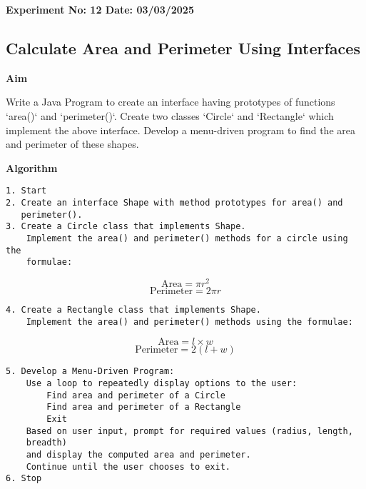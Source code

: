 \textbf{Experiment No: 12 \hfill Date: 03/03/2025}

\begin{center}
    \Large \subsection*{Calculate Area and Perimeter Using Interfaces}
\end{center}

\textbf{Aim}
\vspace{0.5cm}

Write a Java Program to create an interface having prototypes of functions ‘area()‘ and ‘perimeter()‘. Create two classes ‘Circle‘ and ‘Rectangle‘ which implement the above interface. Develop a menu-driven program to find the area and perimeter of these shapes.

\vspace{0.5cm}
\textbf{Algorithm}
\vspace{0.5cm}
\begin{verbatim}
1. Start
2. Create an interface Shape with method prototypes for area() and 
   perimeter().
3. Create a Circle class that implements Shape.
    Implement the area() and perimeter() methods for a circle using the 
    formulae:
\end{verbatim}
\[
\text{Area} = \pi r^2
\]
\[
\text{Perimeter} = 2\pi r
\]
\begin{verbatim}
4. Create a Rectangle class that implements Shape.
    Implement the area() and perimeter() methods using the formulae:
\end{verbatim}
\[
\text{Area} = l \times w
\]
\[
\text{Perimeter} = 2(l + w)
\]
\begin{verbatim}
5. Develop a Menu-Driven Program:
    Use a loop to repeatedly display options to the user:
        Find area and perimeter of a Circle
        Find area and perimeter of a Rectangle
        Exit
    Based on user input, prompt for required values (radius, length, 
    breadth) 
    and display the computed area and perimeter.
    Continue until the user chooses to exit.
6. Stop
\end{verbatim}

